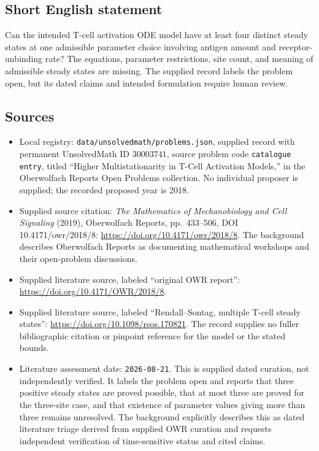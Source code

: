 \documentclass[11pt]{article}
\begin{document}
\subsection{Short English statement}
Can the intended T-cell activation ODE model have at least four distinct steady states at one admissible parameter choice involving antigen amount and receptor-unbinding rate? The equations, parameter restrictions, site count, and meaning of admissible steady states are missing. The supplied record labels the problem open, but its dated claims and intended formulation require human review.
\subsection{Sources}
\begin{itemize}
\item Local registry: \texttt{data/unsolvedmath/problems.json}, supplied record with permanent UnsolvedMath ID \(30003741\), source problem code \texttt{catalogue entry}, titled ``Higher Multistationarity in T-Cell Activation Models,'' in the Oberwolfach Reports Open Problems collection. No individual proposer is supplied; the recorded proposed year is 2018.
\item Supplied source citation: \emph{The Mathematics of Mechanobiology and Cell Signaling} (2019), Oberwolfach Reports, pp.\ 433--506, DOI 10.4171/owr/2018/8: \url{https://doi.org/10.4171/owr/2018/8}. The background describes Oberwolfach Reports as documenting mathematical workshops and their open-problem discussions.
\item Supplied literature source, labeled ``original OWR report'': \url{https://doi.org/10.4171/OWR/2018/8}.
\item Supplied literature source, labeled ``Rendall--Sontag, multiple T-cell steady states'': \url{https://doi.org/10.1098/rsos.170821}. The record supplies no fuller bibliographic citation or pinpoint reference for the model or the stated bounds.
\item Literature assessment date: \texttt{2026-08-21}. This is supplied dated curation, not independently verified. It labels the problem open and reports that three positive steady states are proved possible, that at most three are proved for the three-site case, and that existence of parameter values giving more than three remains unresolved. The background explicitly describes this as dated literature triage derived from supplied OWR curation and requests independent verification of time-sensitive status and cited claims.
\end{itemize}
\end{document}

